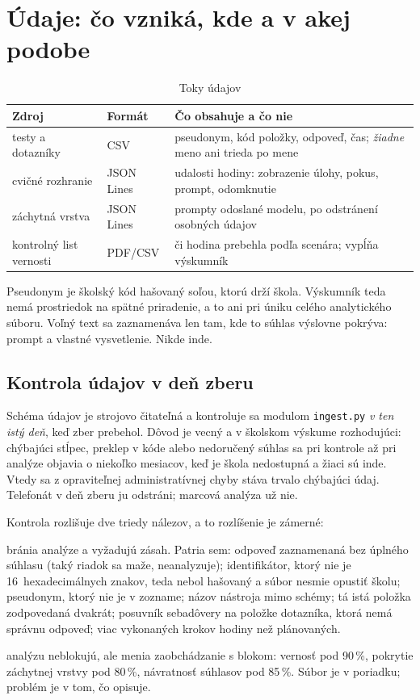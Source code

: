 \section{Údaje: čo vzniká, kde a v akej podobe}

\begin{table}[H]
\centering
\caption{Toky údajov}
\label{tab:toky}
\small
\begin{tabularx}{\textwidth}{@{}l l X@{}}
\toprule
\textbf{Zdroj} & \textbf{Formát} & \textbf{Čo obsahuje a čo nie} \\
\midrule
testy a dotazníky & CSV & pseudonym, kód položky, odpoveď, čas; \emph{žiadne} meno ani trieda po mene \\
cvičné rozhranie & JSON Lines & udalosti hodiny: zobrazenie úlohy, pokus, prompt, odomknutie \\
záchytná vrstva & JSON Lines & prompty odoslané modelu, po odstránení osobných údajov \\
kontrolný list vernosti & PDF/CSV & či hodina prebehla podľa scenára; vypĺňa výskumník \\
\bottomrule
\end{tabularx}
\end{table}

Pseudonym je školský kód hašovaný soľou, ktorú drží škola. Výskumník teda nemá prostriedok na spätné priradenie, a to ani pri úniku celého analytického súboru. Voľný text sa zaznamenáva len tam, kde to súhlas výslovne pokrýva: prompt a vlastné vysvetlenie. Nikde inde.

\subsection*{Kontrola údajov v deň zberu}

Schéma údajov je strojovo čitateľná a kontroluje sa modulom \texttt{ingest.py} \emph{v ten istý deň}, keď zber prebehol. Dôvod je vecný a v školskom výskume rozhodujúci: chýbajúci stĺpec, preklep v kóde alebo nedoručený súhlas sa pri kontrole až pri analýze objavia o niekoľko mesiacov, keď je škola nedostupná a žiaci sú inde. Vtedy sa z opraviteľnej administratívnej chyby stáva trvalo chýbajúci údaj. Telefonát v deň zberu ju odstráni; marcová analýza už nie.

Kontrola rozlišuje dve triedy nálezov, a to rozlíšenie je zámerné:

\begin{description}[leftmargin=0.6cm, nosep]
    \item[\textbf{Chyby}] bránia analýze a vyžadujú zásah. Patria sem: odpoveď zaznamenaná bez úplného súhlasu (taký riadok sa maže, neanalyzuje); identifikátor, ktorý nie je 16~hexadecimálnych znakov, teda nebol hašovaný a súbor nesmie opustiť školu; pseudonym, ktorý nie je v zozname; názov nástroja mimo schémy; tá istá položka zodpovedaná dvakrát; posuvník sebadôvery na položke dotazníka, ktorá nemá správnu odpoveď; viac vykonaných krokov hodiny než plánovaných.
    \item[\textbf{Upozornenia}] analýzu neblokujú, ale menia zaobchádzanie s blokom: vernosť pod 90\,\%, pokrytie záchytnej vrstvy pod 80\,\%, návratnosť súhlasov pod 85\,\%. Súbor je v poriadku; problém je v tom, čo opisuje.
\end{description}

